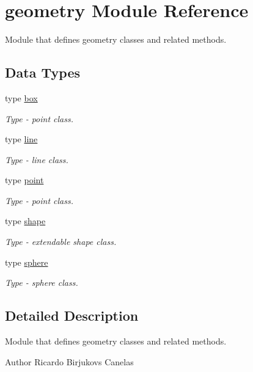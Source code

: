 \hypertarget{namespacegeometry}{}\section{geometry Module Reference}
\label{namespacegeometry}


Module that defines geometry classes and related methods.  


\subsection*{Data Types}
\begin{DoxyCompactItemize}
\item 
type \mbox{\hyperlink{structgeometry_1_1box}{box}}
\begin{DoxyCompactList}\small\item\em Type -\/ point class. \end{DoxyCompactList}\item 
type \mbox{\hyperlink{structgeometry_1_1line}{line}}
\begin{DoxyCompactList}\small\item\em Type -\/ line class. \end{DoxyCompactList}\item 
type \mbox{\hyperlink{structgeometry_1_1point}{point}}
\begin{DoxyCompactList}\small\item\em Type -\/ point class. \end{DoxyCompactList}\item 
type \mbox{\hyperlink{structgeometry_1_1shape}{shape}}
\begin{DoxyCompactList}\small\item\em Type -\/ extendable shape class. \end{DoxyCompactList}\item 
type \mbox{\hyperlink{structgeometry_1_1sphere}{sphere}}
\begin{DoxyCompactList}\small\item\em Type -\/ sphere class. \end{DoxyCompactList}\end{DoxyCompactItemize}


\subsection{Detailed Description}
Module that defines geometry classes and related methods. 

\begin{DoxyAuthor}{Author}
Ricardo Birjukovs Canelas 
\end{DoxyAuthor}
